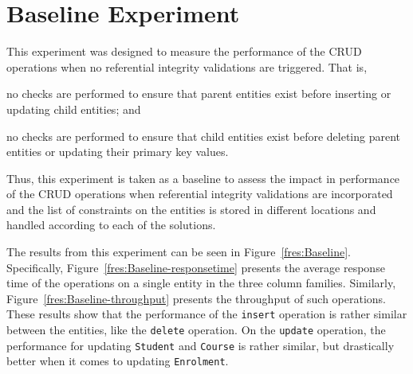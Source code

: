 \section{Baseline Experiment} \label{s:results-Baseline}

This experiment was designed to measure the performance of the \ac{CRUD} 
operations when no referential integrity validations are triggered. That is, 
\begin{inparaenum}[a)]
\item no checks are performed to ensure that parent entities exist before inserting 
or updating child entities; and
\item no checks are performed to ensure that child entities exist before deleting
parent entities or updating their primary key values.
\end{inparaenum}
Thus, this experiment is taken as a baseline to assess the impact in performance of 
the \ac{CRUD} operations when referential integrity validations are incorporated and 
the list of constraints on the entities is stored in different locations and handled 
according to each of the solutions. 


The results from this experiment can be seen in Figure~\ref{fres:Baseline}.
Specifically, Figure~\ref{fres:Baseline-responsetime} presents the average
response time of the operations on a single entity in the three column families.
Similarly, Figure~\ref{fres:Baseline-throughput} presents the throughput of such
operations. These results show that the performance of the  \texttt{insert}
operation is rather similar between the entities, like the \texttt{delete}
operation. On the \texttt{update} operation, the performance for updating
\texttt{Student} and \texttt{Course} is rather similar, but drastically better
when it comes to updating \texttt{Enrolment}.
 

